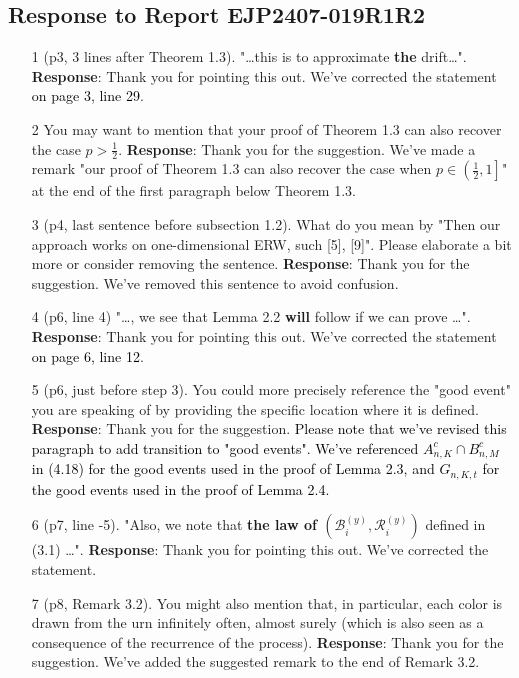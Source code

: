 \documentclass[11pt,a4paper]{article}
\numberwithin{equation}{section}
\newcommand{\PL}[2]{\textcolor{black}{on page {#1}, line {#2}}}
\def\TBF#1{\textcolor{black}{#1}} %
\begin{document}
	\subsection*{Response to Report EJP2407-019R1R2}
	\begin{itemize}
		\item[1] (p3, 3 lines after Theorem 1.3). "\dots this is to approximate \textbf{the} drift\dots".
		\subitem \textbf{Response}:  Thank you for pointing this out.  We've corrected the statement \PL{3}{29}.
		
		
		\item[2] You may want to mention that your proof of Theorem 1.3 can also recover the case $p > \frac{1}{2}$.
		\subitem \textbf{Response}:  Thank you for the suggestion. We've made a remark "our proof of Theorem 1.3 can also recover the case when $p \in \left(\frac{1}{2}, 1\right] $" at the end of the first paragraph below Theorem 1.3.
		
		
		\item[3] (p4, last sentence before subsection 1.2). What do you mean by "Then our approach works on one-dimensional ERW, such [5], [9]". Please elaborate a bit more or consider removing the sentence.
		\subitem \textbf{Response}: Thank you for the suggestion. We've removed this sentence to avoid confusion. 
		
		
		\item[4] (p6, line 4) "\dots , we see that Lemma 2.2 \textbf{will} follow if we can prove \dots".
		\subitem \textbf{Response}:  Thank you for pointing this out.  We've corrected the statement \PL{6}{12}.
		
		
		\item[5] (p6, just before step 3). You could more precisely reference the "good event" you are	speaking of by providing the specific location where it is defined.
		\subitem \textbf{Response}: Thank you for the suggestion. \TBF{Please note that we've revised this paragraph to add transition to "good events". We've referenced $A_{n,K}^c \cap B_{n,M}^c$ in (4.18) for the good events used in the proof of Lemma 2.3, and $G_{n,K,t}$ for the good events used in the proof of Lemma 2.4.}
		
		\item[6](p7, line -5). "Also, we note that \textbf{the law of $\left(\mathcal{B}_i^{(y)}
			,\mathcal{R}_i^{(y)} \right)$} defined in (3.1) \dots ".
		\subitem \textbf{Response}:  Thank you for pointing this out.  We've corrected the statement.
		
		
		\item[7] (p8, Remark 3.2). You might also mention that, in particular, each color is drawn from the
		urn infinitely often, almost surely (which is also seen as a consequence of the recurrence of
		the process).
		\subitem \textbf{Response}:  Thank you for the suggestion. We've added the suggested remark to the end of Remark 3.2.
		

\end{itemize}
\end{document}
